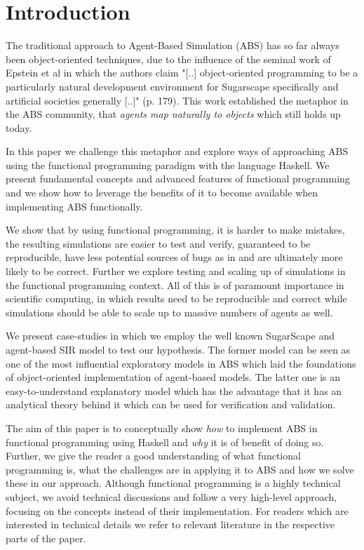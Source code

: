 \section{Introduction}
The traditional approach to Agent-Based Simulation (ABS) has so far always been object-oriented techniques, due to the influence of the seminal work of Epstein et al \cite{epstein_growing_1996} in which the authors claim "[..] object-oriented programming to be a particularly natural development environment for Sugarscape specifically and artificial societies generally [..]" (p. 179). This work established the metaphor in the ABS community, that \textit{agents map naturally to objects} \citep{north_managing_2007} which still holds up today.

In this paper we challenge this metaphor and explore ways of approaching ABS using the functional programming paradigm with the language Haskell. We present fundamental concepts and advanced features of functional programming and we show how to leverage the benefits of it \citep{hudak_history_2007} to become available when implementing ABS functionally.

We show that by using functional programming, it is harder to make mistakes, the resulting simulations are easier to test and verify, guaranteed to be reproducible, have less potential sources of bugs as in \citep{vipindeep_list_2005} and are ultimately more likely to be correct. Further we explore testing and scaling up of simulations in the functional programming context. All of this is of paramount importance in scientific computing, in which results need to be reproducible and correct while simulations should be able to scale up to massive numbers of agents as well. 

We present case-studies in which we employ the well known SugarScape \citep{epstein_growing_1996} and agent-based SIR \citep{macal_agent-based_2010} model to test our hypothesis. The former model can be seen as one of the most influential exploratory models in ABS which laid the foundations of object-oriented implementation of agent-based models. The latter one is an easy-to-understand explanatory model which has the advantage that it has an analytical theory behind it which can be used for verification and validation.

The aim of this paper is to conceptually show \textit{how} to implement ABS in functional programming using Haskell and \textit{why} it is of benefit of doing so. Further, we give the reader a good understanding of what functional programming is, what the challenges are in applying it to ABS and how we solve these in our approach. Although functional programming is a highly technical subject, we avoid technical discussions and follow a very high-level approach, focusing on the concepts instead of their implementation. For readers which are interested in technical details we refer to relevant literature in the respective parts of the paper.

